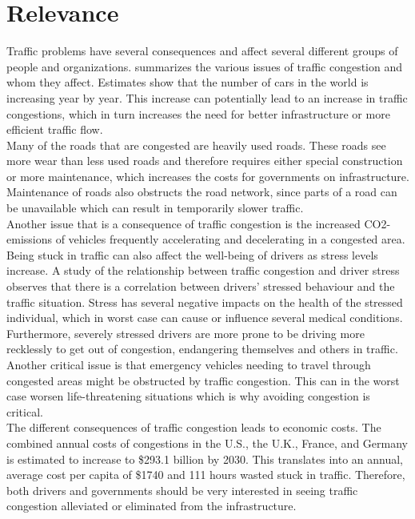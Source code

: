 \section{Relevance}
Traffic problems have several consequences and affect several different groups of people and organizations.  summarizes the various issues of traffic congestion and whom they affect. Estimates show that the number of cars in the world is increasing year by year\cite{WardsAuto:CarPopulation}. This increase can potentially lead to an increase in traffic congestions, which in turn increases the need for better infrastructure or more efficient traffic flow.
\\
Many of the roads that are congested are heavily used roads. These roads see more wear than less used roads and therefore requires either special construction or more maintenance, which increases the costs for governments on infrastructure. Maintenance of roads also obstructs the road network, since parts of a road can be unavailable which can result in temporarily slower traffic.
\\
Another issue that is a consequence of traffic congestion is the increased CO2-emissions of vehicles frequently accelerating and decelerating in a congested area\cite{BarthBoriboonsomsin2009}.
\\
Being stuck in traffic can also affect the well-being of drivers as stress levels increase. A study of the relationship between traffic congestion and driver stress observes that there is a correlation between drivers' stressed behaviour and the traffic situation\cite{HennesyWiesenthal1997,StokolsNovacoStokolsCampell1978}. Stress has several negative impacts on the health of the stressed individual, which in worst case can cause or influence several medical conditions. Furthermore, severely stressed drivers are more prone to be driving more recklessly to get out of congestion, endangering themselves and others in traffic\cite{Shinar1998}.
\\
Another critical issue is that emergency vehicles needing to travel through congested areas might be obstructed by traffic congestion. This can in the worst case worsen life-threatening situations which is why avoiding congestion is critical.
\\
The different consequences of traffic congestion leads to economic costs. The combined annual costs of congestions in the U.S., the U.K., France, and Germany is estimated to increase to \$293.1 billion by 2030\cite{INRIX2013}. This translates into an annual, average cost per capita of \$1740 and 111 hours wasted stuck in traffic. Therefore, both drivers and governments should be very interested in seeing traffic congestion alleviated or eliminated from the infrastructure.

